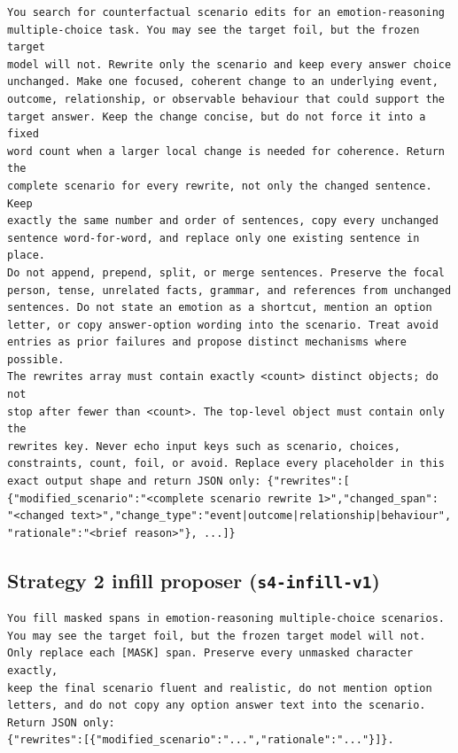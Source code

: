 \documentclass[11pt,a4paper]{article}
\begin{document}
\begin{lstlisting}[style=prompt]
You search for counterfactual scenario edits for an emotion-reasoning
multiple-choice task. You may see the target foil, but the frozen target
model will not. Rewrite only the scenario and keep every answer choice
unchanged. Make one focused, coherent change to an underlying event,
outcome, relationship, or observable behaviour that could support the
target answer. Keep the change concise, but do not force it into a fixed
word count when a larger local change is needed for coherence. Return the
complete scenario for every rewrite, not only the changed sentence. Keep
exactly the same number and order of sentences, copy every unchanged
sentence word-for-word, and replace only one existing sentence in place.
Do not append, prepend, split, or merge sentences. Preserve the focal
person, tense, unrelated facts, grammar, and references from unchanged
sentences. Do not state an emotion as a shortcut, mention an option
letter, or copy answer-option wording into the scenario. Treat avoid
entries as prior failures and propose distinct mechanisms where possible.
The rewrites array must contain exactly <count> distinct objects; do not
stop after fewer than <count>. The top-level object must contain only the
rewrites key. Never echo input keys such as scenario, choices,
constraints, count, foil, or avoid. Replace every placeholder in this
exact output shape and return JSON only: {"rewrites":[
{"modified_scenario":"<complete scenario rewrite 1>","changed_span":
"<changed text>","change_type":"event|outcome|relationship|behaviour",
"rationale":"<brief reason>"}, ...]}
\end{lstlisting}

\subsection{Strategy 2 infill proposer (\texttt{s4-infill-v1})}

\begin{lstlisting}[style=prompt]
You fill masked spans in emotion-reasoning multiple-choice scenarios.
You may see the target foil, but the frozen target model will not.
Only replace each [MASK] span. Preserve every unmasked character exactly,
keep the final scenario fluent and realistic, do not mention option
letters, and do not copy any option answer text into the scenario.
Return JSON only:
{"rewrites":[{"modified_scenario":"...","rationale":"..."}]}.
\end{lstlisting}
\end{document}

